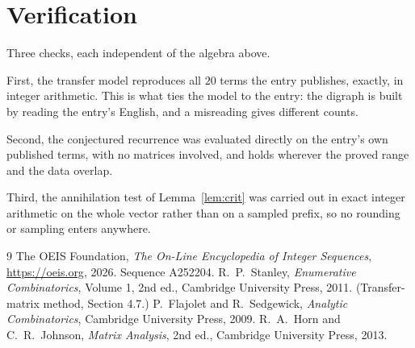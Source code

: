 \documentclass[11pt,a4paper]{article}
\theoremstyle{plain}
\theoremstyle{definition}
\begin{document}
\section{Verification}

Three checks, each independent of the algebra above.

First, the transfer model reproduces all $20$ terms the entry publishes, exactly, in
integer arithmetic. This is what ties the model to the entry: the digraph is built by reading
the entry's English, and a misreading gives different counts.

Second, the conjectured recurrence was evaluated directly on the entry's own published terms,
with no matrices involved, and holds wherever the proved range and the data overlap.

Third, the annihilation test of Lemma~\ref{lem:crit} was carried out in exact integer
arithmetic on the whole vector rather than on a sampled prefix, so no rounding or sampling
enters anywhere.

\begin{thebibliography}{9}
 The OEIS Foundation, \emph{The On-Line Encyclopedia of Integer
Sequences}, \url{https://oeis.org}, 2026. Sequence A252204.
 R.~P.~Stanley, \emph{Enumerative Combinatorics}, Volume 1, 2nd ed.,
Cambridge University Press, 2011. (Transfer-matrix method, Section 4.7.)
 P.~Flajolet and R.~Sedgewick, \emph{Analytic Combinatorics}, Cambridge
University Press, 2009.
 R.~A.~Horn and C.~R.~Johnson, \emph{Matrix Analysis}, 2nd ed., Cambridge
University Press, 2013.
\end{thebibliography}
\end{document}
